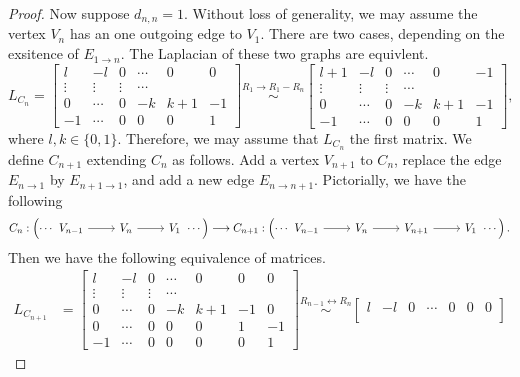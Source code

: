 \documentclass[11pt,reqno]{amsart}
\theoremstyle{definition}
\theoremstyle{plain}
\begin{document}
\begin{proof}
			Now suppose $d_{n,n} = 1$. Without loss of generality, we may assume the vertex $V_n$ has an one outgoing edge to $V_1$. 
			There are two cases, depending on the exsitence of $E_{1\to n}$.
			The Laplacian of these two graphs are equivlent. 
			$$
			L_{C_n} = \begin{bmatrix}
				l  & -l & 0 & \cdots & 0 & 0 \\
				\vdots & \vdots & \vdots & \cdots \\
				0 & \cdots & 0 & -k & k+1 & -1 \\
				-1 & \cdots & 0 & 0 & 0 & 1 
			\end{bmatrix}
			\stackrel{R_{1}\to R_1  - R_n}\sim
			\begin{bmatrix}
				l+1  & -l & 0 & \cdots & 0 & -1 \\
				\vdots & \vdots & \vdots & \cdots \\
				0 & \cdots & 0 & -k & k+1 & -1 \\
				-1 & \cdots & 0 & 0 & 0 & 1 
			\end{bmatrix},
			$$
			where $l, k \in \{ 0, 1 \}$. 
			Therefore, we may assume that $L_{C_n}$ the first matrix.
			We define $C_{n+1}$ extending $C_n$ as follows. 
			Add a vertex $V_{n+1}$ to $C_n$, 
			replace the edge $E_{n \to 1}$ by $E_{n+1 \to 1}$, and 
			add a new edge $E_{n \to n+1}$. 
			Pictorially, we have the following
			\[
				C_n: \left( \cdots \begin{tikzcd}
					V_{n-1} \arrow[r] & V_n \arrow[r] & V_1 
				\end{tikzcd} \cdots \right)
				\longrightarrow
				C_{n+1}: \left( \cdots \begin{tikzcd}
					V_{n-1} \arrow[r] & V_n \arrow[r] & V_{n+1} \arrow[r] & V_1 
				\end{tikzcd} \cdots \right).
			\]
			Then we have the following equivalence of matrices.
			\begin{align}
			L_{C_{n+1}} &= 
			\begin{bmatrix} 
				l  & -l & 0 & \cdots & 0 & 0 & 0 \\
				\vdots & \vdots & \vdots & \cdots \\
				0 & \cdots & 0 & -k & k+1 & -1 & 0  \\
				0 & \cdots & 0 & 0 & 0 & 1 & -1 \\ 
				-1 & \cdots & 0 & 0 & 0 & 0 & 1 
			\end{bmatrix} \stackrel{R_{n-1}\leftrightarrow R_{n}}{\sim}
			\begin{bmatrix} 
				l  & -l & 0 & \cdots & 0 & 0 & 0 \\

\end{bmatrix}
\end{align}
\end{proof}
\end{document}

